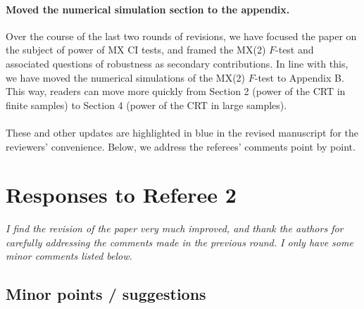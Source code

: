 \documentclass[12pt]{article}
\begin{document}
\paragraph{Moved the numerical simulation section to the appendix.} Over the course of the last two rounds of revisions, we have focused the paper on the subject of power of MX CI tests, and framed the MX(2) $F$-test and associated questions of robustness as secondary contributions. In line with this, we have moved the numerical simulations of the MX(2) $F$-test to Appendix B. This way, readers can move more quickly from Section 2 (power of the CRT in finite samples) to Section 4 (power of the CRT in large samples).

\paragraph{}

These and other updates are highlighted in blue in the revised manuscript for the reviewers' convenience. Below, we address the referees' comments point by point.

\section{Responses to Referee 2}

\textsl{I find the revision of the paper very much improved, and thank the authors for carefully addressing the comments made in the previous round. I only have some minor comments listed below.}

\subsection{Minor points / suggestions}
\end{document}
